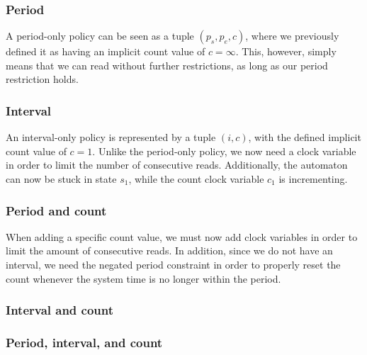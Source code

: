 \subsubsection{Period}
A period-only policy can be seen as a tuple $(p_s, p_e, c)$, where we previously defined it as having an implicit count value of $c = \infty$.
This, however, simply means that we can read without further restrictions, as long as our period restriction holds.

\begin{figure}[H]
  \centering
  
\end{figure}

\subsubsection{Interval}
An interval-only policy is represented by a tuple $(i, c)$, with the defined implicit count value of $c = 1$.
Unlike the period-only policy, we now need a clock variable in order to limit the number of consecutive reads.
Additionally, the automaton can now be stuck in state $s_1$, while the count clock variable $c_1$ is incrementing.

\begin{figure}[H]
  \centering
  
\end{figure}

\subsubsection{Period and count}
When adding a specific count value, we must now add clock variables in order to limit the amount of consecutive reads.
In addition, since we do not have an interval, we need the negated period constraint in order to properly reset the count whenever the system time is no longer within the period.

\begin{figure}[H]
  \centering
  
\end{figure}

\subsubsection{Interval and count}


\subsubsection{Period, interval, and count}



\begin{figure}[H]
  \centering
  
\end{figure}
